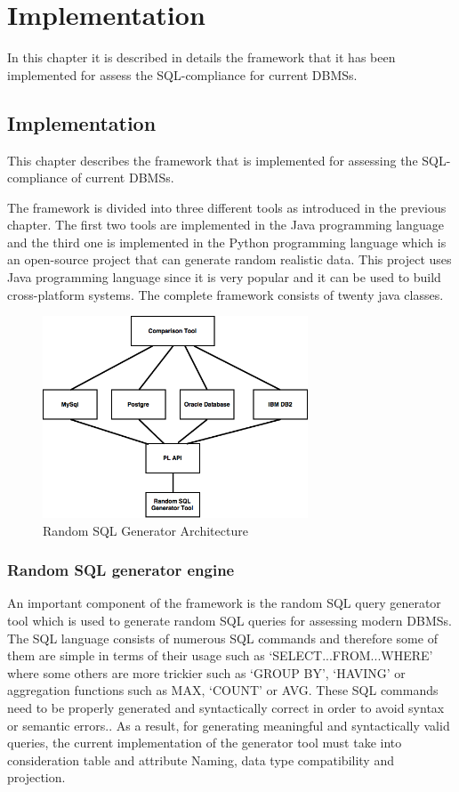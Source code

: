 \chapter{Implementation}
In this chapter it is described in details the framework that it has been implemented for assess the SQL-compliance for current DBMSs.

\section{Implementation}
This chapter describes the framework that is implemented for assessing the SQL-compliance of current DBMSs.

The framework is divided into three different tools as introduced in the previous chapter. The first two tools are implemented in the Java programming language and the third one is implemented in the Python programming language which is an open-source project that can generate random realistic data.  This project uses Java programming language since it is very popular and it can be used to build cross-platform systems. The complete framework consists of twenty java classes. 


 \begin{figure} 
      \centering
      \includegraphics[width=\textwidth,height=6cm]{Images/1-implemen_detail}
      \caption{Random SQL Generator Architecture}
      \label{fig:counting-methods}
  \end{figure}

\subsection{Random SQL generator engine}
An important component of the framework is the random SQL query generator tool which is used to generate random SQL queries for assessing modern DBMSs. The SQL language consists of numerous SQL commands and therefore some of them are simple in terms of their usage such as ‘SELECT...FROM...WHERE’ where some others are more trickier such as ‘GROUP BY’, ‘HAVING’ or aggregation functions such as MAX, ‘COUNT’ or AVG. These SQL commands need to be properly generated and syntactically correct in order to avoid syntax or semantic errors.. As a result, for generating meaningful and syntactically valid queries, the current implementation of the generator tool must take into consideration table and attribute Naming, data type compatibility and projection.

